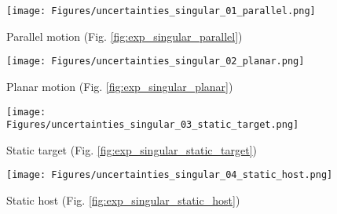 \documentclass[journal]{IEEEtran}
\def\StateVector{\mathbf{\Theta}}
\begin{document}
\begin{figure*}[t]
\centering
    \begin{subfigure}[t]{0.245\textwidth}
    \centering
	\texttt{[image: Figures/uncertainties\_singular\_01\_parallel.png]}
    \caption{Parallel motion (Fig. \ref{fig:exp_singular_parallel})}
    \label{fig:uncertainties_singular_parallel}
    \end{subfigure}%
    \hfill
    \begin{subfigure}[t]{0.245\textwidth}
    \centering
	\texttt{[image: Figures/uncertainties\_singular\_02\_planar.png]}
    \caption{Planar motion (Fig. \ref{fig:exp_singular_planar})}
    \label{fig:uncertaintis_singular_planar}
    \end{subfigure}%
    \hfill
    \begin{subfigure}[t]{0.245\textwidth}
    \centering
	\texttt{[image: Figures/uncertainties\_singular\_03\_static\_target.png]}
    \caption{Static target (Fig. \ref{fig:exp_singular_static_target})}
    \label{fig:uncertainties_singular_static_target}
    \end{subfigure}%
    \hfill
    \begin{subfigure}[t]{0.245\textwidth}
    \centering
	\texttt{[image: Figures/uncertainties\_singular\_04\_static\_host.png]}
    \caption{Static host (Fig. \ref{fig:exp_singular_static_host})}
    \label{fig:uncertainties_singular_static_host}
    \end{subfigure}%
\caption{Estimation errors (top row) and uncertainty metrics (bottom row) in simulations. We can see that: 1) the estimated uncertainty metrics are clearly much larger in unobservable (Fig. \ref{fig:uncertainties_singular_parallel}-\ref{fig:uncertainties_singular_static_host}) than observable cases (Fig. \ref{fig:uncertainty_metrics_real_flights}), 2) if the standard error $\sigma_i$ or estimation error $e_i$ do not improve over time, the parameter $\Theta_i$ is likely to be unobservable in that configuration.}
\label{fig:uncertainty_metrics_simulations}
\end{figure*}
\end{document}
